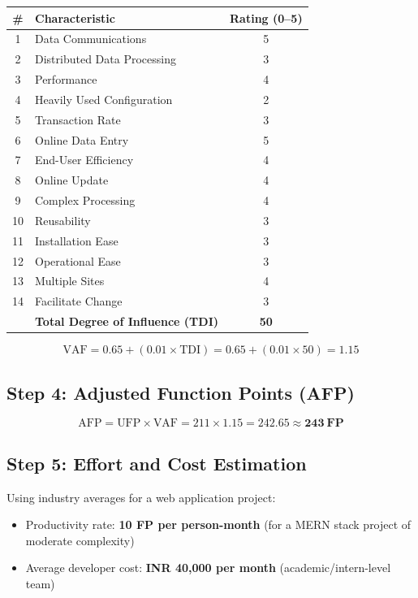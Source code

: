 \documentclass[12pt,a4paper]{article}
\begin{document}
\begin{center}
\begin{tabular}{clc}
\toprule
\textbf{\#} & \textbf{Characteristic} & \textbf{Rating (0--5)} \\
\midrule
1 & Data Communications & 5 \\
2 & Distributed Data Processing & 3 \\
3 & Performance & 4 \\
4 & Heavily Used Configuration & 2 \\
5 & Transaction Rate & 3 \\
6 & Online Data Entry & 5 \\
7 & End-User Efficiency & 4 \\
8 & Online Update & 4 \\
9 & Complex Processing & 4 \\
10 & Reusability & 3 \\
11 & Installation Ease & 3 \\
12 & Operational Ease & 3 \\
13 & Multiple Sites & 4 \\
14 & Facilitate Change & 3 \\
\midrule
 & \textbf{Total Degree of Influence (TDI)} & \textbf{50} \\
\bottomrule
\end{tabular}
\end{center}

\[
\text{VAF} = 0.65 + (0.01 \times \text{TDI}) = 0.65 + (0.01 \times 50) = \mathbf{1.15}
\]

\subsection{Step 4: Adjusted Function Points (AFP)}

\[
\text{AFP} = \text{UFP} \times \text{VAF} = 211 \times 1.15 = \mathbf{242.65 \approx 243~FP}
\]

\subsection{Step 5: Effort and Cost Estimation}

Using industry averages for a web application project:
\begin{itemize}[noitemsep]
    \item Productivity rate: \textbf{10 FP per person-month} (for a MERN stack project of moderate complexity)
    \item Average developer cost: \textbf{\textrm{INR} 40,000 per month} (academic/intern-level team)
\end{itemize}
\end{document}
